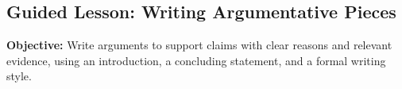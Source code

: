 \documentclass[12pt]{article}
\begin{document}
\subsection*{Guided Lesson: Writing Argumentative Pieces}
\onehalfspacing

\begin{tcolorbox}[colframe=black!40, colback=gray!5, 
coltitle=black, colbacktitle=black!20, fonttitle=\bfseries\Large, 
title=Learning Objective, halign title=center, left=5pt, right=5pt, top=5pt, bottom=5pt]
\textbf{Objective:} Write arguments to support claims with clear reasons and relevant evidence, using an introduction, a concluding statement, and a formal writing style.  
\end{tcolorbox}

\end{document}
